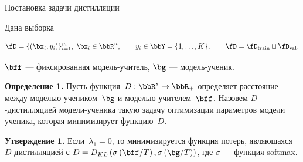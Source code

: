 \documentclass[12pt, aspectratio=169]{beamer}
\begin{document}
\begin{frame}{Постановка задачи дистилляции}
\begin{block}{Дана выборка}
\vspace{-0.5 cm}

$$\fD = \{(\bx_i, y_i)\}_{i=1}^{m},\; \bx_i \in \bbR^n,\qquad y_i \in \bbY = \{1, \dots, K\},\qquad \fD = \fD_\text{train} \sqcup \fD_\text{val}.$$
\end{block}

\vspace{-0.3 cm}
$\bff$ --- фиксированная модель-учитель, $\bg$ --- модель-ученик.

\vspace{0.5 cm} 
\textbf{Определение 1.}
Пусть функция~$D: \bbR^s \to \bbR_{+}$ определяет расстояние между моделью-учеником~$\bg$ и моделью-учителем~$\bff$. Назовем $D$-дистилляцией модели-ученика такую задачу оптимизации параметров модели ученика, которая минимизирует функцию~$D$.

\vspace{0.5 cm}
\fontsize{11}{5}\selectfont

\textbf{Утверждение 1.}
Если~$\lambda_1 = 0$, то минимизируется функция потерь, являющаяся $D$-дистилляцией с $D = D_{KL}\left(\sigma\left(\bff/T\right), \sigma\left(\bg/T\right)\right)$, где $\sigma$ --- функция softmax.

\end{frame}
\end{document}
